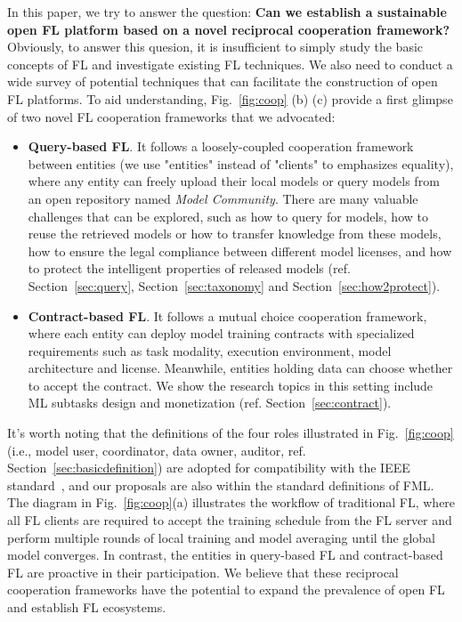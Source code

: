 In this paper, we try to answer the question: \textbf{Can we establish a sustainable open FL platform based on a novel reciprocal cooperation framework?}
Obviously, to answer this quesion, it is insufficient to simply study the basic concepts of FL and investigate existing FL techniques.
We also need to conduct a wide survey of potential techniques that can facilitate the construction of open FL platforms.
To aid understanding, Fig.~\ref{fig:coop} (b) (c) provide a first glimpse of two novel FL cooperation frameworks that we advocated: 
\begin{itemize}
    \item \textbf{Query-based FL}. It follows a loosely-coupled cooperation framework between entities (we use "entities" instead of "clients" to emphasizes equality), where any entity can freely upload their local models or query models from an open repository named \textit{Model Community}.
    There are many valuable challenges that can be explored, such as how to query for models, how to reuse the retrieved models or how to transfer knowledge from these models, how to ensure the legal compliance between different model licenses, and how to protect the intelligent properties of released models (ref. Section~\ref{sec:query}, Section~\ref{sec:taxonomy} and Section~\ref{sec:how2protect}). %
    \item \textbf{Contract-based FL}. It follows a mutual choice cooperation framework, where each entity can deploy model training contracts with specialized requirements such as task modality, execution environment, model architecture and license. Meanwhile, entities holding data can choose whether to accept the contract.
    We show the research topics in this setting include ML subtasks design and monetization (ref. Section~\ref{sec:contract}).
\end{itemize}
It's worth noting that the definitions of the four roles illustrated in Fig.~\ref{fig:coop} (i.e., model user, coordinator, data owner, auditor, ref. Section~\ref{sec:basicdefinition}) are adopted for compatibility with the IEEE standard~\cite{IEEEstd3652}, and our proposals are also within the standard definitions of FML.
The diagram in Fig.~\ref{fig:coop}(a) illustrates the workflow of traditional FL, where all FL clients are required to accept the training schedule from the FL server and perform multiple rounds of local training and model averaging until the global model converges.
In contrast, the entities in query-based FL and contract-based FL are proactive in their participation.
We believe that these reciprocal cooperation frameworks have the potential to expand the prevalence of open FL and establish FL ecosystems.


